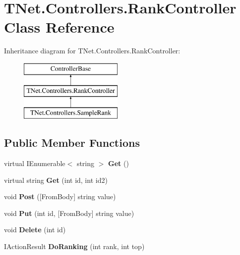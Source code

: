 \hypertarget{class_t_net_1_1_controllers_1_1_rank_controller}{}\section{T\+Net.\+Controllers.\+Rank\+Controller Class Reference}
\label{class_t_net_1_1_controllers_1_1_rank_controller}
Inheritance diagram for T\+Net.\+Controllers.\+Rank\+Controller\+:\begin{figure}[H]
\begin{center}
\leavevmode
\includegraphics[height=3.000000cm]{class_t_net_1_1_controllers_1_1_rank_controller}
\end{center}
\end{figure}
\subsection*{Public Member Functions}
\begin{DoxyCompactItemize}
\item 
\mbox{\label{class_t_net_1_1_controllers_1_1_rank_controller_a2eab740ac63773df99ed150cae8b632d}} 
virtual I\+Enumerable$<$ string $>$ {\bfseries Get} ()
\item 
\mbox{\label{class_t_net_1_1_controllers_1_1_rank_controller_a8836338ca9b89211bb115d8e1355bc29}} 
virtual string {\bfseries Get} (int id, int id2)
\item 
\mbox{\label{class_t_net_1_1_controllers_1_1_rank_controller_ad2378bfef33eeadcf603d1ce5cdda9ca}} 
void {\bfseries Post} (\mbox{[}From\+Body\mbox{]} string value)
\item 
\mbox{\label{class_t_net_1_1_controllers_1_1_rank_controller_a083357089443223c533bed7598cd77ca}} 
void {\bfseries Put} (int id, \mbox{[}From\+Body\mbox{]} string value)
\item 
\mbox{\label{class_t_net_1_1_controllers_1_1_rank_controller_a15b505785ffd113ebafd76ec38cfb931}} 
void {\bfseries Delete} (int id)
\item 
\mbox{\label{class_t_net_1_1_controllers_1_1_rank_controller_a27d4e5425a6492053523676c0e797e84}} 
I\+Action\+Result {\bfseries Do\+Ranking} (int rank, int top)
\end{DoxyCompactItemize}
